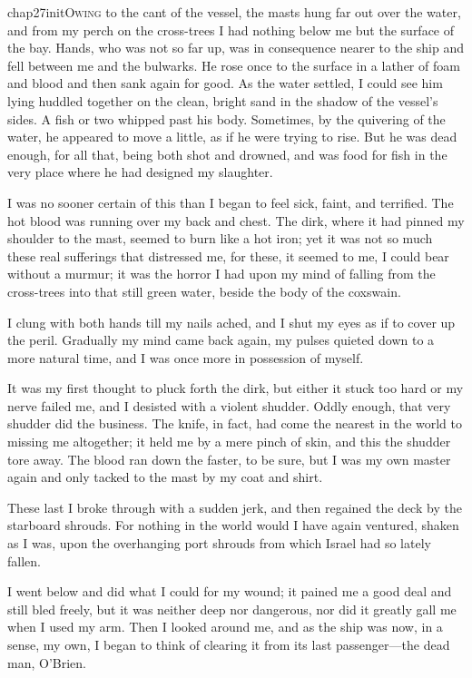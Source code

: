 
\lettrine{chap27initO}{wing} to the cant of the vessel, the masts hung far out over the water, and from my perch on the cross-trees I had nothing below me but the surface of the bay. Hands, who was not so far up, was in consequence nearer to the ship and fell between me and the bulwarks. He rose once to the surface in a lather of foam and blood and then sank again for good. As the water settled, I could see him lying huddled together on the clean, bright sand in the shadow of the vessel's sides. A fish or two whipped past his body. Sometimes, by the quivering of the water, he appeared to move a little, as if he were trying to rise. But he was dead enough, for all that, being both shot and drowned, and was food for fish in the very place where he had designed my slaughter.

I was no sooner certain of this than I began to feel sick, faint, and terrified. The hot blood was running over my back and chest. The dirk, where it had pinned my shoulder to the mast, seemed to burn like a hot iron; yet it was not so much these real sufferings that distressed me, for these, it seemed to me, I could bear without a murmur; it was the horror I had upon my mind of falling from the cross-trees into that still green water, beside the body of the coxswain.

I clung with both hands till my nails ached, and I shut my eyes as if to cover up the peril. Gradually my mind came back again, my pulses quieted down to a more natural time, and I was once more in possession of myself.

It was my first thought to pluck forth the dirk, but either it stuck too hard or my nerve failed me, and I desisted with a violent shudder. Oddly enough, that very shudder did the business. The knife, in fact, had come the nearest in the world to missing me altogether; it held me by a mere pinch of skin, and this the shudder tore away. The blood ran down the faster, to be sure, but I was my own master again and only tacked to the mast by my coat and shirt.

These last I broke through with a sudden jerk, and then regained the deck by the starboard shrouds. For nothing in the world would I have again ventured, shaken as I was, upon the overhanging port shrouds from which Israel had so lately fallen.

I went below and did what I could for my wound; it pained me a good deal and still bled freely, but it was neither deep nor dangerous, nor did it greatly gall me when I used my arm. Then I looked around me, and as the ship was now, in a sense, my own, I began to think of clearing it from its last passenger—the dead man, O'Brien.

